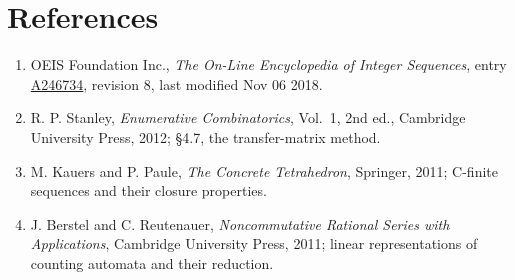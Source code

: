 \documentclass[11pt]{article}
\theoremstyle{definition}
\begin{document}
\section{References}

\begin{enumerate}

\item OEIS Foundation Inc., \emph{The On-Line Encyclopedia of Integer Sequences}, entry \href{https://oeis.org/A246734}{A246734}, revision 8, last modified Nov 06 2018.

\item R. P. Stanley, \emph{Enumerative Combinatorics}, Vol.~1, 2nd ed., Cambridge University Press, 2012; \S4.7, the transfer-matrix method.

\item M. Kauers and P. Paule, \emph{The Concrete Tetrahedron}, Springer, 2011; C-finite sequences and their closure properties.

\item J. Berstel and C. Reutenauer, \emph{Noncommutative Rational Series with Applications}, Cambridge University Press, 2011; linear representations of counting automata and their reduction.

\end{enumerate}
\end{document}
